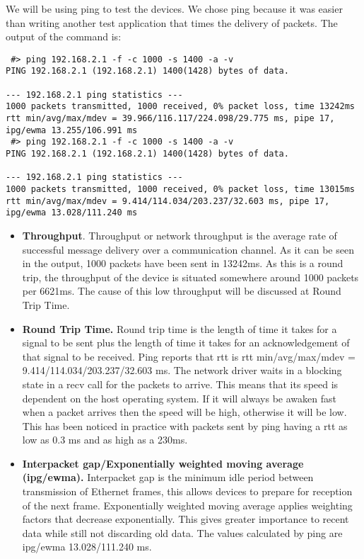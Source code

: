 We will be using ping to test the devices. We chose ping because it was easier than writing another test application
that times the delivery of packets. The output of the command is:
\lstset{language=zsh,caption=,label=lst:pingout}
\begin{lstlisting}
 #> ping 192.168.2.1 -f -c 1000 -s 1400 -a -v
PING 192.168.2.1 (192.168.2.1) 1400(1428) bytes of data.
                 
--- 192.168.2.1 ping statistics ---
1000 packets transmitted, 1000 received, 0% packet loss, time 13242ms
rtt min/avg/max/mdev = 39.966/116.117/224.098/29.775 ms, pipe 17, ipg/ewma 13.255/106.991 ms
 #> ping 192.168.2.1 -f -c 1000 -s 1400 -a -v
PING 192.168.2.1 (192.168.2.1) 1400(1428) bytes of data.
                 
--- 192.168.2.1 ping statistics ---
1000 packets transmitted, 1000 received, 0% packet loss, time 13015ms
rtt min/avg/max/mdev = 9.414/114.034/203.237/32.603 ms, pipe 17, ipg/ewma 13.028/111.240 ms
\end{lstlisting}

\begin{itemize}
  \item \textbf{Throughput}. Throughput or network throughput is the average rate of successful message delivery 
over a communication channel. As it can be seen in the output, 1000 packets have been sent in 13242ms. As this
is a round trip, the throughput of the device is situated somewhere around 1000 packets per 6621ms. The cause of this
low throughput will be discussed at Round Trip Time.
  \item \textbf{Round Trip Time.}  Round trip time is the length of time it takes for a signal to be sent plus the 
length of time it takes for an acknowledgement of that signal to be received. Ping reports that rtt is
rtt min/avg/max/mdev = 9.414/114.034/203.237/32.603 ms. The network driver waits in a blocking state in a recv
call for the packets to arrive. This means that its speed is dependent on the host operating system. If it will
always be awaken fast when a packet arrives then the speed will be high, otherwise it will be low. This has been
noticed in practice with packets sent by ping having a rtt as low as 0.3 ms and as high as a 230ms.
  \item \textbf{Interpacket gap/Exponentially weighted moving average (ipg/ewma).} Interpacket gap is the minimum idle period
between transmission of Ethernet frames, this allows devices to prepare for reception of the next frame. Exponentially weighted moving
average applies weighting factors that decrease exponentially. This gives greater importance to recent data while still not discarding
old data. The values calculated by ping are ipg/ewma 13.028/111.240 ms.
\end{itemize}

